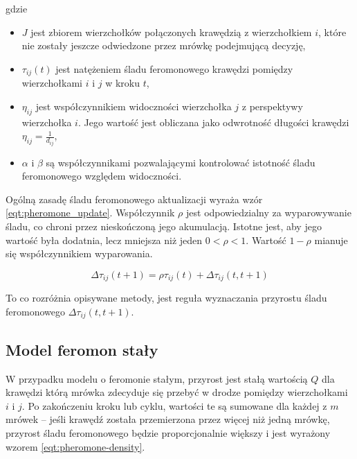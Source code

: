 {{        gdzie
        \begin{itemize}
            \item $J$ jest zbiorem wierzchołków połączonych krawędzią z wierzchołkiem $i$, które nie zostały jeszcze
            odwiedzone przez mrówkę podejmującą decyzję,
            \item $\tau_{ij}(t)$ jest natężeniem śladu feromonowego krawędzi pomiędzy wierzchołkami $i$ i $j$ w kroku
            $t$,
            \item $\eta_{ij}$ jest współczynnikiem widoczności wierzchołka $j$ z perspektywy wierzchołka $i$. Jego
            wartość jest obliczana jako odwrotność długości krawędzi $\eta_{ij} = \frac{1}{d_{ij}}$,
            \item $\alpha$ i $\beta$ są współczynnikami pozwalającymi kontrolować istotność śladu feromonowego względem
            widoczności.
        \end{itemize}

        Ogólną zasadę śladu feromonowego aktualizacji wyraża wzór \ref{eqt:pheromone_update}. Współczynnik $\rho$ jest
        odpowiedzialny za wyparowywanie śladu, co chroni przez nieskończoną jego akumulacją. Istotne jest, aby jego
        wartość była dodatnia, lecz mniejsza niż jeden $0 < \rho < 1$. Wartość $1 - \rho$ mianuje się współczynnikiem
        wyparowania.

        \begin{equation}\label{eqt:pheromone_update}
            \Delta\tau_{ij}(t + 1) = \rho\tau_{ij}(t) + \Delta\tau_{ij}(t, t + 1)
        \end{equation}

        To co rozróżnia opisywane metody, jest reguła wyznaczania przyrostu śladu feromonowego $\Delta\tau_{ij}(t, t +
        1)$.

        \subsection{Model feromon stały}
        {
            W przypadku modelu o feromonie stałym, przyrost jest stałą wartością $Q$ dla krawędzi którą mrówka zdecyduje
            się przebyć w drodze pomiędzy wierzchołkami $i$ i $j$. Po zakończeniu kroku lub cyklu, wartości te są
            sumowane dla każdej z $m$ mrówek -- jeśli krawędź została przemierzona przez więcej niż jedną mrówkę,
            przyrost śladu feromonowego będzie proporcjonalnie większy i jest wyrażony wzorem
            \ref{eqt:pheromone-density}.

}}}
